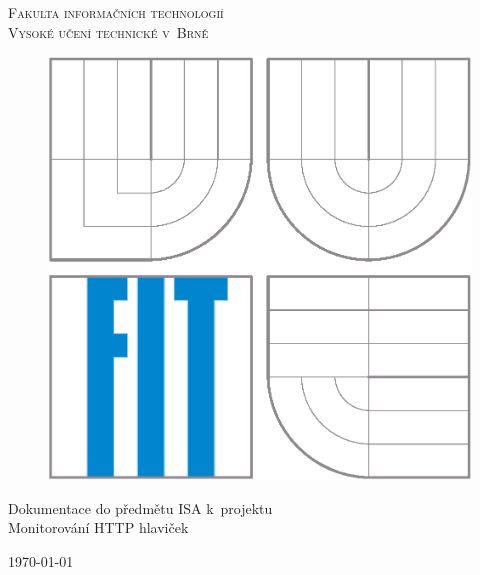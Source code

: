 \documentclass[a4paper, 11pt, titlepage]{article}
\begin{document}
\begin{titlepage}
\begin{center}
	\Large \textsc{Fakulta informačních technologií \\ Vysoké učení technické v~Brně} \\

	\begin{figure}[h]
		\begin{center}
    		\scalebox{0.35}
    		{   
        		\includegraphics{./img/logo.eps}
    		}
		\end{center}
	\end{figure}

	Dokumentace do předmětu ISA k~projektu \\ \huge{Monitorování HTTP hlaviček}  \\

	\begin{center}
	{\Large \today}
	\end{center}


\end{center}
\end{titlepage}
\end{document}

